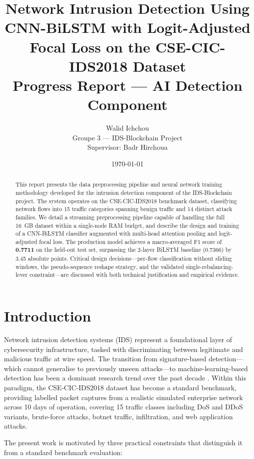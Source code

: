 \documentclass[12pt]{article}
\title{\textbf{Network Intrusion Detection Using CNN-BiLSTM with Logit-Adjusted Focal Loss on the CSE-CIC-IDS2018 Dataset}\\[0.5em]
\large Progress Report — AI Detection Component}
\author{Walid Ichchou \\[0.3em]
\small Groupe 3 — IDS-Blockchain Project \\[0.3em]
Supervisor: Badr Hirchoua}
\date{\today}
\theoremstyle{plain}
\begin{document}
\maketitle

\begin{abstract}
This report presents the data preprocessing pipeline and neural network training methodology developed for the intrusion detection component of the IDS-Blockchain project. The system operates on the CSE-CIC-IDS2018 benchmark dataset, classifying network flows into 15 traffic categories spanning benign traffic and 14 distinct attack families. We detail a streaming preprocessing pipeline capable of handling the full 16~GB dataset within a single-node RAM budget, and describe the design and training of a CNN-BiLSTM classifier augmented with multi-head attention pooling and logit-adjusted focal loss. The production model achieves a macro-averaged F1 score of \textbf{0.7711} on the held-out test set, surpassing the 2-layer BiLSTM baseline (0.7366) by 3.45 absolute points. Critical design decisions—per-flow classification without sliding windows, the pseudo-sequence reshape strategy, and the validated single-rebalancing-lever constraint—are discussed with both technical justification and empirical evidence.
\end{abstract}

\tableofcontents
\clearpage

\listoffigures
\newpage
\listoftables
\newpage

\section*{Introduction}

Network intrusion detection systems (IDS) represent a foundational layer of cybersecurity infrastructure, tasked with discriminating between legitimate and malicious traffic at wire speed. The transition from signature-based detection—which cannot generalise to previously unseen attacks—to machine-learning-based detection has been a dominant research trend over the past decade \cite{Liao2013}. Within this paradigm, the CSE-CIC-IDS2018 dataset \cite{CIC2018} has become a standard benchmark, providing labelled packet captures from a realistic simulated enterprise network across 10 days of operation, covering 15 traffic classes including DoS and DDoS variants, brute-force attacks, botnet traffic, infiltration, and web application attacks.

The present work is motivated by three practical constraints that distinguish it from a standard benchmark evaluation:
\end{document}
